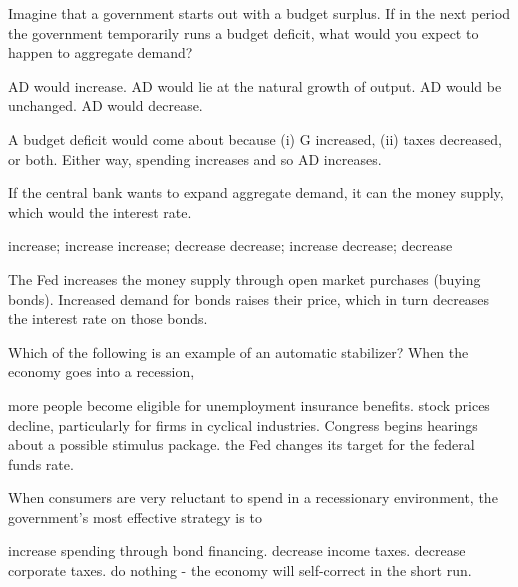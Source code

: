 \documentclass[addpoints,11pt]{exam}
\theoremstyle{definition}
\newcommand{\blank}[0]{\underline{\hspace{3cm}}}
\begin{document}
\begin{questions}
	
	\question Imagine that a government starts out with a budget surplus. If in the next period the government temporarily runs a budget deficit, what would you expect to happen to aggregate demand?
	
	\begin{choices}
		\CorrectChoice AD would increase.
		\choice AD would lie at the natural growth of output.
		\choice AD would be unchanged.
		\choice AD would decrease. 
	\end{choices}
	
	\begin{solution}
		A budget deficit would come about because (i) G increased, (ii) taxes decreased, or both. Either way, spending increases and so AD increases.
	\end{solution}
	
	
	\question If the central bank wants to expand aggregate demand, it can \blank the money supply, which would \blank the interest rate.
	
	\begin{choices}
		\choice increase; increase
		\CorrectChoice increase; decrease
		\choice decrease; increase
		\choice decrease; decrease
	\end{choices}
	
	\begin{solution}
		The Fed increases the money supply through open market purchases (buying bonds). Increased demand for bonds raises their price, which in turn decreases the interest rate on those bonds.
	\end{solution}
	

	\question Which of the following is an example of an automatic stabilizer? When the economy goes into a recession,
	
	\begin{choices}
		\CorrectChoice more people become eligible for unemployment insurance benefits.
		\choice stock prices decline, particularly for firms in cyclical industries.
		\choice Congress begins hearings about a possible stimulus package.
		\choice the Fed changes its target for the federal funds rate.
	\end{choices}
	
	
	
	\question When consumers are very reluctant to spend in a recessionary environment, the government's most effective strategy is to 
	
	\begin{choices}
		\CorrectChoice increase spending through bond financing.
		\choice decrease income taxes.
		\choice decrease corporate taxes.
		\choice do nothing - the economy will self-correct in the short run.
	\end{choices}
	

\end{questions}
\end{document}
